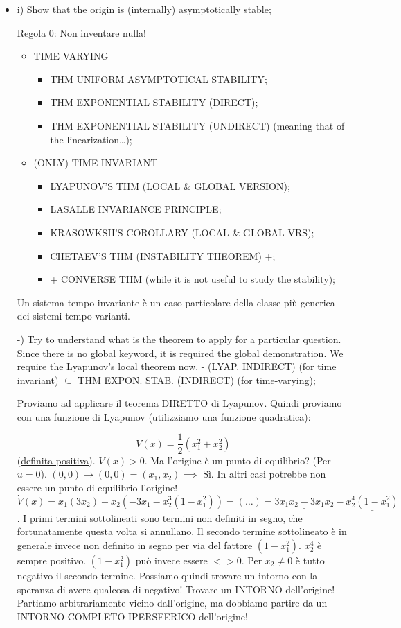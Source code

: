 \begin{itemize}
\item{i)} Show that the origin is (internally) asymptotically stable;

Regola 0: Non inventare nulla!

\begin{itemize}
\item{TIME VARYING}
\begin{itemize}
\item THM UNIFORM ASYMPTOTICAL STABILITY;
\item THM EXPONENTIAL STABILITY (DIRECT);
\item THM EXPONENTIAL STABILITY (UNDIRECT) (meaning that of the linearization\dots);
\end{itemize}
\item{(ONLY) TIME INVARIANT}
\begin{itemize}
\item LYAPUNOV'S THM (LOCAL \& GLOBAL VERSION);
\item LASALLE INVARIANCE PRINCIPLE;
\item KRASOWKSII'S COROLLARY (LOCAL \& GLOBAL VRS);
\item CHETAEV'S THM (INSTABILITY THEOREM) +;
\item + CONVERSE THM (while it is not useful to study the stability);
\end{itemize}
\end{itemize}

Un sistema tempo invariante è un caso particolare della classe più generica dei sistemi tempo-varianti.

-) Try to understand what is the theorem to apply for a particular question. Since there is no global keyword, it is required the global demonstration. We require the Lyapunov's local theorem now.
- (LYAP. INDIRECT) (for time invariant) $\subseteq$ THM EXPON. STAB. (INDIRECT) (for time-varying);

Proviamo ad applicare il \underline{teorema DIRETTO di Lyapunov}. Quindi proviamo con una funzione di Lyapunov (utilizziamo una funzione quadratica):

\[
	V(x) = \frac{1}{2}(x_1^2 + x_2^2)
\]
(\underline{definita positiva}). $V(x)>0$. Ma l'origine è un punto di equilibrio? (Per $u=0$). $(0,0)\rightarrow (0,0)=(\dot{x}_1,\dot{x}_2) \implies$ Sì. In altri casi potrebbe non essere un punto di equilibrio l'origine! $\dot{V}(x) = x_1(3x_2) + x_2(-3x_1 -x_2^3(1-x_1^2)) = (\dots) = \underline{3x_1x_2 - 3x_1x_2} - \underline{x_2^4(1-x_1^2)}$. I primi termini sottolineati sono termini non definiti in segno, che fortunatamente questa volta si annullano. Il secondo termine sottolineato è in generale invece non definito in segno per via del fattore $(1-x_1^2)$. $x_2^4$ è sempre positivo. $(1-x_1^2)$ può invece essere $<> 0$. Per $x_2\neq 0$ è tutto negativo il secondo termine. Possiamo quindi trovare un intorno con la speranza di avere qualcosa di negativo! Trovare un INTORNO dell'origine! Partiamo arbitrariamente vicino dall'origine, ma dobbiamo partire da un INTORNO COMPLETO IPERSFERICO dell'origine!


\end{itemize}

